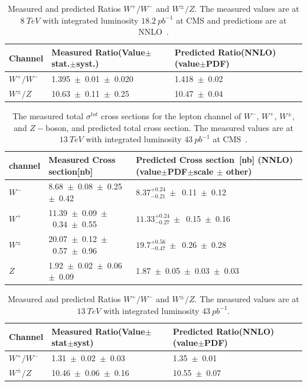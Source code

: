 \begin{table}[H]
\caption{Measured and predicted Ratios $W^{+}/W^{-}$ and $W^{\pm}/Z$. The measured values are at $8~TeV$ with integrated luminosity $18.2~pb^{-1}$ at CMS and predictions are at NNLO~\cite{Chatrchyan_2014}.} 
\centering
\begin{tabular}{|l|p{6cm}|p{6cm}|}
\hline
Channel&\bf Measured Ratio\newline(Value$\pm$stat.$\pm$syst.)&\bf Predicted Ratio(NNLO)\newline(value$\pm$PDF)\\
\hline
\hline
$W^{+}/W^{-}$&1.395~$\pm$~0.01~$\pm$~0.020&1.418~$\pm$~0.02\\
$W^{\pm}/Z$&10.63~$\pm$~0.11~$\pm$~0.25&10.47~$\pm$~0.04\\
\hline
\end{tabular}
\label{8_2}
\end{table}

\begin{table}[H]
\caption{The measured total $\sigma^{tot}$ cross sections for the lepton channel of $W^{-}$, $W^{+}$, $W^{\pm}$, and $Z-$boson, and predicted total cross section. The measured values are at $13~TeV$ with integrated luminosity $43~pb^{-1}$ at CMS~\cite{CMS:2015ois}.}
\centering
\begin{tabular}{|l|p{6cm}|p{6cm}| }
\hline
\bf channel&\bf Measured Cross section[nb] &\bf Predicted Cross section~[nb] (NNLO) (value$\pm$PDF$\pm$scale $\pm$ other)\\
\hline
\hline
$W^{-}$&8.68~$\pm$~0.08~$\pm$~0.25~$\pm$~0.42&$8.37_{-0.21}^{+0.24}~\pm$~0.11~$\pm$~0.12\\
$W^{+}$&11.39~$\pm$~0.09~$\pm$~0.34~$\pm$~0.55&$11.33_{-0.27}^{+0.24}~\pm$~0.15~$\pm$~0.16\\
$W^{\pm}$&20.07~$\pm$~0.12~$\pm$~0.57~$\pm$~0.96&$19.7_{-0.47}^{+0.56}~\pm$~0.26~$\pm$~0.28\\
\hline
\hline
$Z$&1.92~$\pm$~0.02~$\pm$~0.06~$\pm$~0.09&1.87~$\pm$~0.05~$\pm$~0.03~$\pm$~0.03\\
\hline
\end{tabular}
\label{13_1}
\end{table}

\begin{table}[H]
\caption{Measured and predicted Ratios $W^{+}/W^{-}$ and $W^{\pm}/Z$. The measured values are at $13~TeV$ with integrated luminosity $43~pb^{-1}$\cite{CMS:2015ois}.} 
\centering
\begin{tabular}{|l|p{6cm}|p{6cm}|}
\hline
\bf Channel&\bf Measured Ratio\newline(Value$\pm$stat$\pm$syst)&\bf Predicted Ratio(NNLO)\newline(value$\pm$PDF)\\
\hline
\hline
$W^{+}/W^{-}$&1.31~$\pm$~0.02~$\pm$~0.03&1.35~$\pm$~0.01\\
$W^{\pm}/Z$&10.46~$\pm$~0.06~$\pm$~0.16&10.55~$\pm$~0.07\\
\hline
\end{tabular}
\label{13_2}
\end{table}

